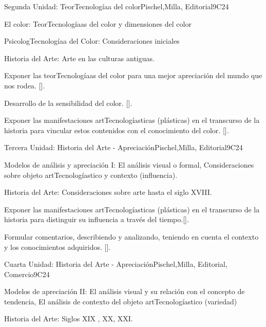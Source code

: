 \begin{syllabus}
\begin{unit}{}{Segunda Unidad: TeorTecnologíaa del color}{Pischel,Milla, Editorial}{9}{C24}
\begin{topics}
	\item El color: TeorTecnologíaas del color y dimensiones del color
	\item PsicologTecnologíaa del Color: Consideraciones iniciales
	\item Historia del Arte: Arte en las culturas antiguas.
\end{topics}
\begin{learningoutcomes}
	\item Exponer las teorTecnologíaas del color para una mejor apreciación del mundo que nos rodea. [\Usage].
	\item Desarrollo de la sensibilidad del color. [\Usage].
	\item Exponer las manifestaciones  artTecnologíasticas (plásticas) en el transcurso de la historia para vincular estos contenidos con el conocimiento del color.
 [\Usage].
\end{learningoutcomes}
\end{unit}

\begin{unit}{}{Tercera Unidad: Historia del Arte - Apreciación}{Pischel,Milla, Editorial}{9}{C24}
\begin{topics}
	\item Modelos de análisis y apreciación I: El análisis visual o formal, Consideraciones sobre objeto artTecnologíastico y contexto (influencia).
	\item Historia del Arte: Consideraciones sobre arte hasta el siglo  XVIII.
\end{topics}
\begin{learningoutcomes}
	\item Exponer las manifestaciones  artTecnologíasticas (plásticas) en el transcurso de la historia para distinguir su influencia a través del tiempo.[\Usage].
	\item Formular comentarios, describiendo y analizando, teniendo en cuenta el contexto y los conocimientos adquiridos. [\Usage].
\end{learningoutcomes}
\end{unit}

\begin{unit}{}{Cuarta Unidad: Historia del Arte - Apreciación}{Pischel,Milla, Editorial, Comercio}{9}{C24}
\begin{topics}
	\item Modelos de apreciación II: El análisis visual y su relación con el concepto de tendencia,  El análisis de contexto del objeto artTecnologíastico (variedad)
	\item Historia del Arte: Siglos  XIX , XX, XXI.
\end{topics}


\end{unit}
\end{syllabus}
